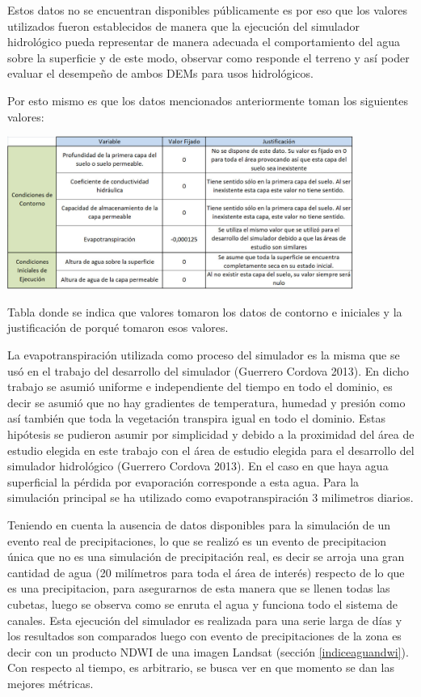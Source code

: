 \documentclass[10pt,a4paper, twoside]{report}
\begin{document}
Estos datos no se encuentran disponibles públicamente es por eso que los valores utilizados fueron establecidos de manera que la ejecución del simulador hidrológico pueda representar de manera adecuada el comportamiento del agua sobre la superficie y de este modo, observar como responde el terreno y así poder evaluar el desempeño de ambos DEMs para usos hidrológicos.

Por esto mismo es que los datos mencionados anteriormente toman los siguientes valores:


\begin{table}[H]
   \centering      
   \includegraphics[width=0.85\textwidth]{imagenes/DatosContorno.jpg}
 \caption{Tabla donde se indica que valores tomaron los datos de contorno e iniciales y la justificación de porqué tomaron esos valores.}
 \label{datoscontorno}
\end{table}

La evapotranspiración utilizada como proceso del simulador es la misma que se usó en el trabajo del desarrollo del simulador (Guerrero Cordova 2013). En dicho trabajo se asumió uniforme e independiente del tiempo en todo el dominio, es decir se asumió que no hay gradientes de temperatura, humedad y presión como así también que toda la vegetación transpira igual en todo el dominio. Estas hipótesis se pudieron asumir por simplicidad y debido a la proximidad del área de estudio elegida en este trabajo con el área de estudio elegida para el desarrollo del simulador hidrológico (Guerrero Cordova 2013). En el caso en que haya agua superficial la pérdida por evaporación corresponde a esta agua. Para la simulación principal se ha utilizado como evapotranspiración 3 milimetros diarios.

Teniendo en cuenta la ausencia de datos disponibles para la simulación de un evento real de precipitaciones, lo que se realizó es un evento de precipitacion única que no es una simulación de precipitación real, es decir se arroja una gran cantidad de agua (20 milímetros para toda el área de interés) respecto de lo que es una precipitacion, para asegurarnos de esta manera que se llenen todas las cubetas, luego se observa como se enruta el agua y funciona todo el sistema de canales. Esta ejecución del simulador es realizada para una serie larga de días y los resultados son comparados luego con evento de precipitaciones de la zona es decir con un producto NDWI de una imagen Landsat (sección \ref{indiceaguandwi}). Con respecto al tiempo, es arbitrario, se busca ver en que momento se dan las mejores métricas.
\end{document}
